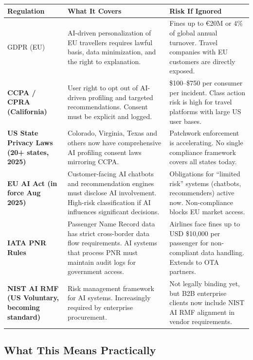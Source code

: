 \documentclass[11pt, a4paper]{article}
\begin{document}
\begin{longtable}{>{\bfseries}p{3.5cm} p{4.5cm} p{5.5cm}}
\toprule
\textbf{Regulation} & \textbf{What It Covers} & \textbf{Risk If Ignored} \\
\midrule
\endhead
\bottomrule
\endfoot

GDPR (EU) &
AI-driven personalization of EU travellers requires lawful basis, data minimization, and the right to explanation. &
Fines up to \euro{}20M or 4\% of global annual turnover. Travel companies with EU customers are directly exposed. \\[6pt]

CCPA / CPRA (California) &
User right to opt out of AI-driven profiling and targeted recommendations. Consent must be explicit and logged. &
\$100--\$750 per consumer per incident. Class action risk is high for travel platforms with large US user bases. \\[6pt]

US State Privacy Laws (20+ states, 2025) &
Colorado, Virginia, Texas and others now have comprehensive AI profiling consent laws mirroring CCPA. &
Patchwork enforcement is accelerating. No single compliance framework covers all states today. \\[6pt]

EU AI Act (in force Aug 2025) &
Customer-facing AI chatbots and recommendation engines must disclose AI involvement. High-risk classification if AI influences significant decisions. &
Obligations for ``limited risk'' systems (chatbots, recommenders) active now. Non-compliance blocks EU market access. \\[6pt]

IATA PNR Rules &
Passenger Name Record data has strict cross-border data flow requirements. AI systems that process PNR must maintain audit logs for government access. &
Airlines face fines up to USD \$10,000 per passenger for non-compliant data handling. Extends to OTA partners. \\[6pt]

NIST AI RMF (US Voluntary, becoming standard) &
Risk management framework for AI systems. Increasingly required by enterprise procurement. &
Not legally binding yet, but B2B enterprise clients now include NIST AI RMF alignment in vendor requirements. \\

\end{longtable}

\vspace{0.5em}
\subsection{What This Means Practically}
\end{document}
